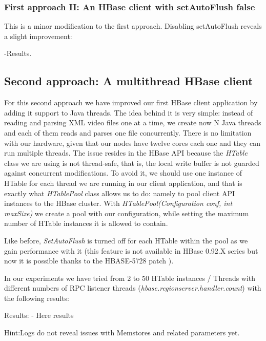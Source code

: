 
\subsubsection{First approach II: An HBase client with setAutoFlush false}

This is a minor modification to the first approach. Disabling setAutoFlush reveals a slight improvement:

-Results.


\subsection{Second approach: A multithread HBase client}

For this second approach we have improved our first HBase client application by adding it support to Java threads. The idea behind it is very simple: instead of reading and parsing XML video files one at a time, we create now N Java threads and each of them reads and parses one file concurrently. There is no limitation with our hardware, given that our nodes have twelve cores each one and they can run multiple threads. The issue resides in the HBase API because the \textit{HTable} class we are using is not thread-safe, that is, the local write buffer is not guarded against concurrent modifications. To avoid it, we should use one instance of HTable for each thread we are running in our client application, and that is exactly what \textit{HTablePool} class allows us to do: namely to pool client API instances to the HBase cluster. With \textit{HTablePool(Configuration conf, int maxSize)} we create a pool with our configuration, while setting the maximum number of HTable instances it is allowed to contain. 
\par
Like before, \textit{SetAutoFlush} is turned off for each HTable within the pool as we gain performance with it (this feature is not available in HBase 0.92.X series but now it is possible thanks to the HBASE-5728 patch \cite{HBase5728}). 
\par
 In our experiments we have tried from 2 to 50 HTable instances / Threads with different numbers of RPC listener threads (\textit{hbase.regionserver.handler.count}) with the following results:
\par
{}
\par
Results: - Here results
\par
Hint:Logs do not reveal issues with Memstores and related parameters yet.

